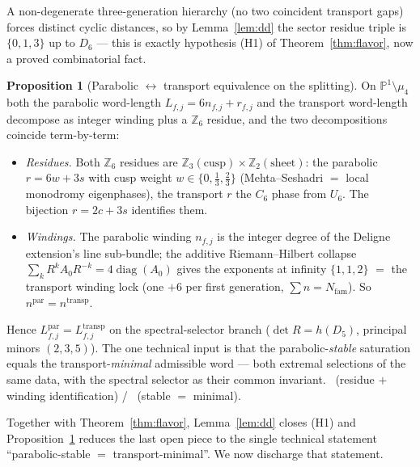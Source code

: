\documentclass[11pt,a4paper]{article}
\newcommand{\Nfam}{N_{\mathrm{fam}}}
\theoremstyle{definition}
\newtheorem{proposition}{Proposition}
\begin{document}
\noindent A non-degenerate three-generation hierarchy (no two coincident transport gaps) forces distinct
cyclic distances, so by Lemma~\ref{lem:dd} the sector residue triple is $\{0,1,3\}$ up to $D_6$ ---
this is exactly hypothesis (H1) of Theorem~\ref{thm:flavor}, now a proved combinatorial fact.

\begin{proposition}[Parabolic $\leftrightarrow$ transport equivalence on the splitting]
\label{prop:equiv}
On $\mathbb P^1\setminus\mu_4$ both the parabolic word-length $L_{f,j}=6n_{f,j}+r_{f,j}$ and the
transport word-length decompose as integer winding plus a $\mathbb Z_6$ residue, and the two
decompositions coincide term-by-term:
\begin{itemize}[leftmargin=1.5em]
\item \emph{Residues.} Both $\mathbb Z_6$ residues are $\mathbb Z_3(\text{cusp})\times\mathbb Z_2(\text{sheet})$:
the parabolic $r=6w+3s$ with cusp weight $w\in\{0,\tfrac13,\tfrac23\}$ (Mehta--Seshadri $=$ local
monodromy eigenphases), the transport $r$ the $C_6$ phase from $U_6$. The bijection $r=2c+3s$ identifies
them.
\item \emph{Windings.} The parabolic winding $n_{f,j}$ is the integer degree of the Deligne extension's
line sub-bundle; the additive Riemann--Hilbert collapse $\sum_k R^kA_0R^{-k}=4\operatorname{diag}(A_0)$
gives the exponents at infinity $\{1,1,2\}$ $=$ the transport winding lock (one $+6$ per first
generation, $\sum n=\Nfam$). So $n^{\mathrm{par}}=n^{\mathrm{transp}}$.
\end{itemize}
Hence $L^{\mathrm{par}}_{f,j}=L^{\mathrm{transp}}_{f,j}$ on the spectral-selector branch
($\det R=h(D_5)$, principal minors $(2,3,5)$). The one technical input is that the parabolic-\emph{stable}
saturation equals the transport-\emph{minimal} admissible word --- both extremal selections of the same
data, with the spectral selector as their common invariant. \mE\ (residue $+$ winding identification)
/ \mC\ (stable $=$ minimal).
\end{proposition}

\noindent Together with Theorem~\ref{thm:flavor}, Lemma~\ref{lem:dd} closes (H1) and
Proposition~\ref{prop:equiv} reduces the last open piece to the single technical statement
``parabolic-stable $=$ transport-minimal''. We now discharge that statement.
\end{document}
